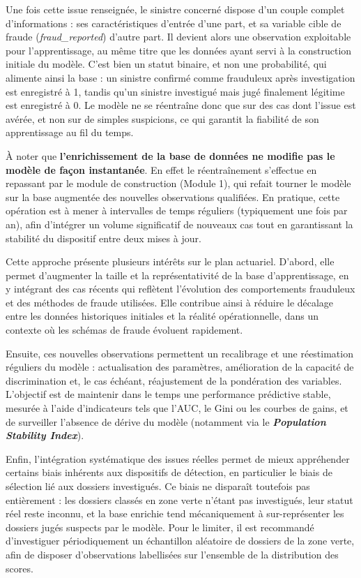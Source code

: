 Une fois cette issue renseignée, le sinistre concerné dispose d'un couple complet d'informations : ses caractéristiques d'entrée d'une part, et sa variable cible de fraude (\textit{fraud\_reported}) d'autre part. Il devient alors une observation exploitable pour l'apprentissage, au même titre que les données ayant servi à la construction initiale du modèle. C'est bien un statut binaire, et non une probabilité, qui alimente ainsi la base : un sinistre confirmé comme frauduleux après investigation est enregistré à 1, tandis qu'un sinistre investigué mais jugé finalement légitime est enregistré à 0. Le modèle ne se réentraîne donc que sur des cas dont l'issue est avérée, et non sur de simples suspicions, ce qui garantit la fiabilité de son apprentissage au fil du temps.

À noter que \textbf{l'enrichissement de la base de données ne modifie pas le modèle de façon instantanée}. En effet le réentraînement s'effectue en repassant par le module de construction (Module 1), qui refait tourner le modèle sur la base augmentée des nouvelles observations qualifiées. En pratique, cette opération est à mener à intervalles de temps réguliers (typiquement une fois par an), afin d'intégrer un volume significatif de nouveaux cas tout en garantissant la stabilité du dispositif entre deux mises à jour.

Cette approche présente plusieurs intérêts sur le plan actuariel. D'abord, elle permet d'augmenter la taille et la représentativité de la base d'apprentissage, en y intégrant des cas récents qui reflètent l'évolution des comportements frauduleux et des méthodes de fraude utilisées. Elle contribue ainsi à réduire le décalage entre les données historiques initiales et la réalité opérationnelle, dans un contexte où les schémas de fraude évoluent rapidement.

Ensuite, ces nouvelles observations permettent un recalibrage et une réestimation réguliers du modèle : actualisation des paramètres, amélioration de la capacité de discrimination et, le cas échéant, réajustement de la pondération des variables. L'objectif est de maintenir dans le temps une performance prédictive stable, mesurée à l'aide d'indicateurs tels que l'AUC, le Gini ou les courbes de gains, et de surveiller l'absence de dérive du modèle (notamment via le \textbf{\textit{Population Stability Index}}).

Enfin, l'intégration systématique des issues réelles permet de mieux appréhender certains biais inhérents aux dispositifs de détection, en particulier le biais de sélection lié aux dossiers investigués. Ce biais ne disparaît toutefois pas entièrement : les dossiers classés en zone verte n'étant pas investigués, leur statut réel reste inconnu, et la base enrichie tend mécaniquement à sur-représenter les dossiers jugés suspects par le modèle. Pour le limiter, il est recommandé d'investiguer périodiquement un échantillon aléatoire de dossiers de la zone verte, afin de disposer d'observations labellisées sur l'ensemble de la distribution des scores.

